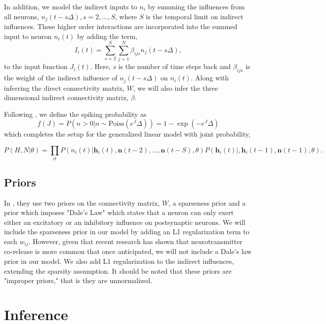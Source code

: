 \documentclass{article}
\begin{document}

In addition, we model the indirect inputs to $n_i$ by summing the
influences from all neurons, $n_j(t-s\Delta), s=2,...,S$, where $S$
is the temporal limit on indirect influences. These higher order
interactions are incorporated into the summed input to neuron
$n_i(t)$ by adding the term,
\begin{equation}
\label{new_term}
I_i(t)=\displaystyle\sum\limits_{s=2}^S\sum\limits_{j=1}^N \beta_{ijs}n_j(t-s\Delta),
\end{equation}
to the input function $J_i(t)$. Here, $s$ is the number of time
steps back and $\beta_{ijs}$ is the weight of the indirect influence
of $n_j(t-s\Delta)$ on $n_i(t)$. Along with inferring the direct connectivity matrix, $W$, we will
also infer the three dimensional indirect connectivity matrix, $\beta$.

Following \citep{mishchencko2011}, we define the spiking probability as 
\begin{equation} \label{f}
f(J) = P\left(n>0 | n \sim \text{Poiss}(e^J\Delta)\right) = 1 - \exp(-e^J\Delta)
\end{equation}
which completes the setup for the generalized linear model with joint probability,

\begin{equation} \label{f}
P(H,N|\theta) = \prod_{it}P(n_i(t)|\mathbf{h}_i(t),\mathbf{n}(t-2),...,\mathbf{n}(t-S),\theta)P(\mathbf{h}_i(t)|,\mathbf{h}_i(t-1),\mathbf{n}(t-1),\theta).
\end{equation}

\subsection{Priors}
In \citep{mishchencko2011}, they use two priors on the connectivity
matrix, $W$, a sparseness prior and a prior which imposes "Dale's
Law" which states that a neuron can only exert either an excitatory
or an inhibitory influence on postsynaptic neurons. We will include
the sparseness prior in our model by adding an L1 regularization
term to each $w_{ij}$. However, given that recent research has shown
that neurotransmitter co-release is more common that once anticipated,
we will not include a Dale's law prior in our model.
We also add L1 regularization to the indirect influences, extending
the sparsity assumption. It should be noted that these priors are "improper priors," that is they are unnormalized.

\section{Inference}
\end{document}
